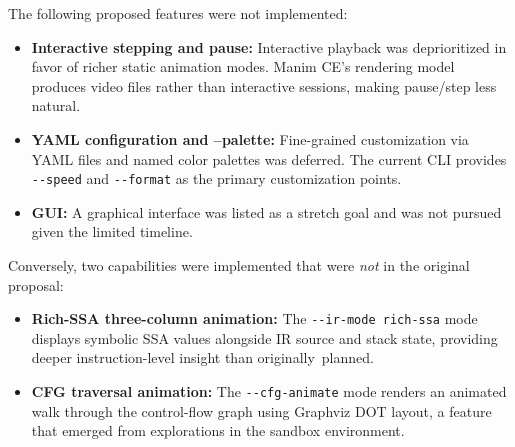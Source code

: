 The following proposed features were not implemented:

\begin{itemize}
    \item \textbf{Interactive stepping and pause:} Interactive playback was deprioritized in favor of richer static animation modes. Manim CE's rendering model produces video files rather than interactive sessions, making pause/step less natural.

    \item \textbf{YAML configuration and --palette:} Fine-grained customization via YAML files and named color palettes was deferred. The current CLI provides \texttt{-{}-speed} and \texttt{-{}-format} as the primary customization points.

    \item \textbf{GUI:} A graphical interface was listed as a stretch goal and was not pursued given the limited timeline.
\end{itemize}

Conversely, two capabilities were implemented that were \textit{not} in the original proposal:
\begin{itemize}
    \item \textbf{Rich-SSA three-column animation:} The \texttt{-{}-ir-mode rich-ssa} mode displays symbolic SSA values alongside IR source and stack state, providing deeper instruction-level insight than originally~planned.
    \item \textbf{CFG traversal animation:} The \texttt{-{}-cfg-animate} mode renders an animated walk through the control-flow graph using Graphviz DOT layout, a feature that emerged from explorations in the sandbox environment.
\end{itemize}
